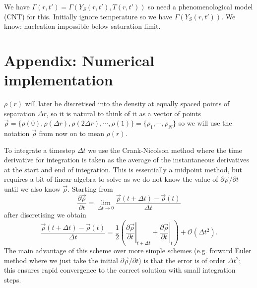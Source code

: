 \documentclass[12pt,twoside]{report}
\begin{document}
We have $\Gamma(r,t') = \Gamma(Y_S(r,t'), T(r,t'))$ so need a phenomenological model (CNT) for this.
Initially ignore temperature so we have $\Gamma(Y_S(r,t'))$.
We know: nucleation impossible below saturation limit.

\section*{Appendix: Numerical implementation}

$\rho(r)$ will later be discretised into the density at equally spaced points of separation $\Delta r$, so it is natural to think of it as a vector of points $\vec{\rho} = \{\rho(0), \rho(\Delta r), \rho(2 \Delta r), \cdots, \rho(1)\} = \{\rho_1, \cdots, \rho_N\}$ so we will use the notation $\vec{\rho}$ from
now on to mean $\rho(r)$.

To integrate a timestep $\Delta t$ we use the Crank-Nicolson \cite{Crank1947} method where the time derivative for integration is taken as the average of the instantaneous derivatives at the start and end of integration.
This is essentially a midpoint method, but requires a bit of linear algebra to solve as we do not know the value of $\partial \vec{\rho} / \partial t$ until we also know $\vec{\rho}$.
Starting from
\begin{equation}
  \frac{\partial \vec{\rho}}{\partial t} =
  \lim_{\Delta t \to 0} \frac{\vec{\rho}(t + \Delta t) - \vec{\rho}(t)}{\Delta t}
\end{equation}
after discretising we obtain
\begin{equation}
  \frac{\vec{\rho}(t + \Delta t) - \vec{\rho}(t)}{\Delta t}
  =
  \frac{1}{2}
  \left(
  \left. \frac{\partial \vec{\rho}}{\partial t} \right|_{t + \Delta t}
  +
  \left. \frac{\partial \vec{\rho}}{\partial t} \right|_t
  \right)
  + \mathcal{O}(\Delta t^2).
\end{equation}
The main advantage of this scheme over more simple schemes (e.g. forward Euler method where we just take the initial $\partial \vec{\rho} / \partial t$) is that the error is of order $\Delta t^2$; this ensures rapid convergence to the correct solution with small integration steps.
\end{document}
